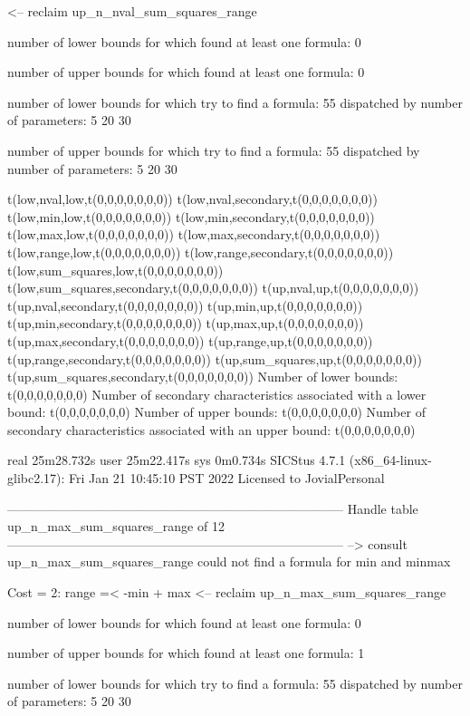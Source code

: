<-- reclaim up_n_nval_sum_squares_range

number of lower bounds for which found at least one formula: 0

number of upper bounds for which found at least one formula: 0

number of lower bounds for which try to find a formula: 55
dispatched by number of parameters: 5  20  30

number of upper bounds for which try to find a formula: 55
dispatched by number of parameters: 5  20  30

t(low,nval,low,t(0,0,0,0,0,0,0))
t(low,nval,secondary,t(0,0,0,0,0,0,0))
t(low,min,low,t(0,0,0,0,0,0,0))
t(low,min,secondary,t(0,0,0,0,0,0,0))
t(low,max,low,t(0,0,0,0,0,0,0))
t(low,max,secondary,t(0,0,0,0,0,0,0))
t(low,range,low,t(0,0,0,0,0,0,0))
t(low,range,secondary,t(0,0,0,0,0,0,0))
t(low,sum_squares,low,t(0,0,0,0,0,0,0))
t(low,sum_squares,secondary,t(0,0,0,0,0,0,0))
t(up,nval,up,t(0,0,0,0,0,0,0))
t(up,nval,secondary,t(0,0,0,0,0,0,0))
t(up,min,up,t(0,0,0,0,0,0,0))
t(up,min,secondary,t(0,0,0,0,0,0,0))
t(up,max,up,t(0,0,0,0,0,0,0))
t(up,max,secondary,t(0,0,0,0,0,0,0))
t(up,range,up,t(0,0,0,0,0,0,0))
t(up,range,secondary,t(0,0,0,0,0,0,0))
t(up,sum_squares,up,t(0,0,0,0,0,0,0))
t(up,sum_squares,secondary,t(0,0,0,0,0,0,0))
Number of lower bounds:                                             t(0,0,0,0,0,0,0)
Number of secondary characteristics associated with a lower bound:  t(0,0,0,0,0,0,0)
Number of upper bounds:                                             t(0,0,0,0,0,0,0)
Number of secondary characteristics associated with an upper bound: t(0,0,0,0,0,0,0)

real	25m28.732s
user	25m22.417s
sys	0m0.734s
SICStus 4.7.1 (x86_64-linux-glibc2.17): Fri Jan 21 10:45:10 PST 2022
Licensed to JovialPersonal


--------------------------------------------------------------------------------
Handle table up_n_max_sum_squares_range of 12
--------------------------------------------------------------------------------
--> consult up_n_max_sum_squares_range
could not find a formula for min and minmax

Cost =  2:  range =< -min + max
<-- reclaim up_n_max_sum_squares_range

number of lower bounds for which found at least one formula: 0

number of upper bounds for which found at least one formula: 1

number of lower bounds for which try to find a formula: 55
dispatched by number of parameters: 5  20  30


